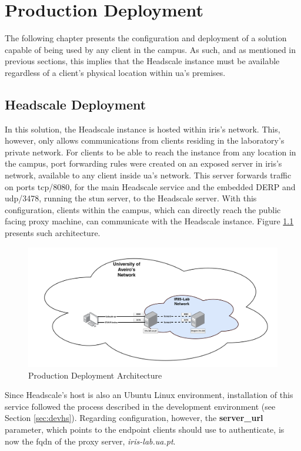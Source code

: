 \documentclass[11pt,twoside,a4paper]{report}
\begin{document}
\chapter{Production Deployment}

The following chapter presents the configuration and deployment of a solution capable of being used by any client in the campus. As such, and as mentioned in previous sections, this implies that the Headscale instance must be available regardless of a client's physical location within \ac{ua}'s premises.

\section{Headscale Deployment}

In this solution, the Headscale instance is hosted within \ac{iris}'s network. This, however, only allows communications from clients residing in the laboratory's private network. For clients to be able to reach the instance from any location in the campus, port forwarding rules were created on an exposed server in \ac{iris}'s network, available to any client inside \ac{ua}'s network. This server forwards traffic on ports \ac{tcp}/8080, for the main Headscale service and the embedded \ac{DERP} and \ac{udp}/3478, running the \ac{stun} server, to the Headscale server. With this configuration, clients within the campus, which can directly reach the public facing proxy machine, can communicate with the Headscale instance. Figure \ref{fig:prodsolution} presents such architecture.

\begin{figure}[h]
\centering
\includegraphics[width=\textwidth]{prod.png}
\caption{Production Deployment Architecture}
\label{fig:prodsolution}
\end{figure}

Since Headscale's host is also an Ubuntu Linux environment, installation of this service followed the process described in the development environment (see Section \ref{sec:devhs}). Regarding configuration, however, the \textbf{server\_url} parameter, which points to the endpoint clients should use to authenticate, is now the \ac{fqdn} of the proxy server, \emph{iris-lab.ua.pt}.
\end{document}
